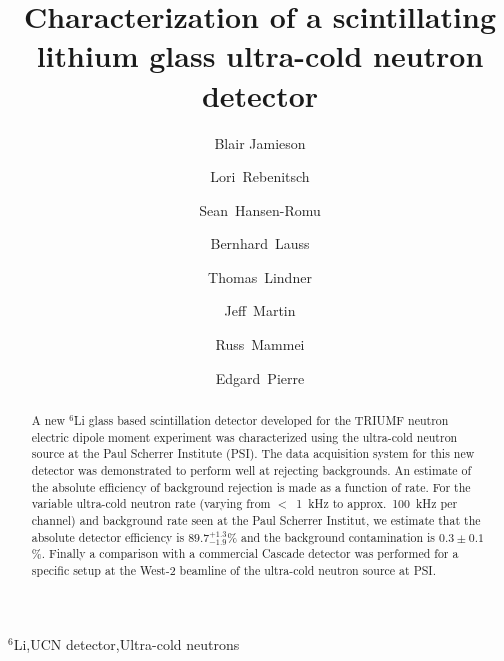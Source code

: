 \documentclass[letter,twocolumn,preprint,3p]{elsarticle}
\begin{document}
\begin{frontmatter}

\title{Characterization of a scintillating lithium glass ultra-cold neutron detector }



\author[aWpg]{Blair Jamieson}
\author[aWpg]{Lori~Rebenitsch}
\author[aWpg]{Sean~Hansen-Romu}
\author[aPSI]{Bernhard~Lauss}
\author[aTRIUMF,aWpg]{Thomas~Lindner}
\author[aWpg]{Jeff~Martin}
\author[aWpg]{Russ~Mammei}
\author[aRCNP,aTRIUMF]{Edgard~Pierre}



\address[aWpg]{Department of Physics, University of Winnipeg, 515
  Portage Avenue, Winnipeg, MB, Canada.}

\address[aPSI]{Laboratory for Particle Physics, Paul Scherrer
  Institut, CH5232 Villigen PSI, Switzerland.}

\address[aTRIUMF]{TRIUMF, 4004 Wesbrook Mall, Vancouver, BC, Canada. } 

\address[aRCNP]{Research Centre for Nuclear Physics, Osaka University,
  Osaka, Japan.}



\begin{abstract}

A new $^{6}$Li glass based scintillation detector developed for the
TRIUMF neutron electric dipole moment experiment was characterized
using the ultra-cold neutron source at the Paul Scherrer Institute
(PSI).  The data acquisition system for this new detector was
demonstrated to perform well at rejecting backgrounds. An estimate of
the absolute efficiency of background rejection is made as a function
of rate.  For the variable ultra-cold neutron rate (varying from
$<$~1~kHz to approx.\ 100~kHz per channel) and background rate seen at
the Paul Scherrer Institut, we estimate that the absolute detector
efficiency is $89.7^{+1.3}_{-1.9}$\% and the background contamination
is $0.3\pm0.1$\%.  Finally a comparison with a commercial Cascade
detector was performed for a specific setup at the West-2 beamline of
the ultra-cold neutron source at PSI.

\end{abstract}

\begin{keyword}
$^6$Li\sep UCN detector\sep Ultra-cold neutrons 
\end{keyword}

\end{frontmatter}
\end{document}
